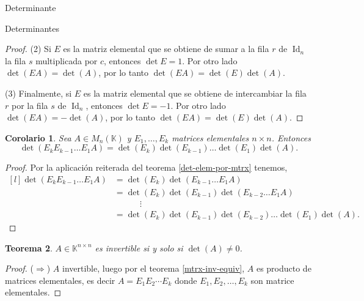 \documentclass[a4paper,12pt,twoside,spanish,reqno]{amsbook}
\numberwithin{equation}{section}
\newtheorem{teorema}{Teorema}[section]
\newtheorem{corolario}[teorema]{Corolario}
\theoremstyle{definition}
\theoremstyle{remark}
\newcommand{\Id}{\operatorname{Id}}
\newcommand{\K}{\mathbb K}
\begin{document}
\begin{chapter}{Determinante}
\begin{section}{Determinantes}
\begin{proof}
             
             (2) Si $E$ es la matriz elemental que se obtiene de sumar a la fila $r$ de $\Id_n$  la fila $s$ multiplicada por $c$, entonces $\det E =1$. Por  otro lado  $\det(EA) = \det(A)$, por lo tanto  $\det(EA) = \det(E)\det(A)$.
             
             (3) Finalmente, si $E$ es la matriz elemental que se obtiene de intercambiar la fila $r$ por la fila $s$ de $\Id_n$, entonces $\det E=-1$. Por  otro lado  $\det(EA) = -\det(A)$, por lo tanto  $\det(EA) = \det(E)\det(A)$.
         \end{proof}
         
         \begin{corolario}\label{coro-det-prod-elem-mtrx}
             Sea $A  \in M_n(\K)$ y $E_1,\ldots,E_k$ matrices elementales $n \times n$. Entonces
             \begin{equation*}
             \det (E_kE_{k-1}\ldots E_1A) = \det (E_k) \det (E_{k-1})\ldots \det (E_1) \det (A).
             \end{equation*}  
         \end{corolario}
         \begin{proof}
             Por  la aplicación reiterada del teorema \ref{det-elem-por-mtrx} tenemos, 
             \begin{equation*}
             \begin{matrix*}[l]
             \det (E_kE_{k-1}\ldots E_1A) &= \det (E_k) \det(E_{k-1}\ldots E_1 A) \\
             &= \det( E_k) \det(E_{k-1})\det(E_{k-2}\ldots E_1A) \\
             &\qquad\quad \vdots \\
             & = \det( E_k) \det(E_{k-1})\det(E_{k-2})\ldots \det(E_1) \det(A).
             \end{matrix*}		
             \end{equation*}
         \end{proof}
         


         \begin{teorema}\label{th-det-matriz-invertible}
            $A \in \K^{n \times n}$ es invertible si y solo si $\det(A) \ne 0$.
        \end{teorema}
        \begin{proof}
            ($\Rightarrow$)  $A$ invertible, luego por el  teorema \ref{mtrx-inv-equiv}, $A$ es producto de matrices elementales, es decir  $A = E_1 E_2 \cdots E_k$  donde $E_1, E_2, \ldots, E_k$ son matrice elementales. 
            

\end{proof}
\end{section}
\end{chapter}
\end{document}
